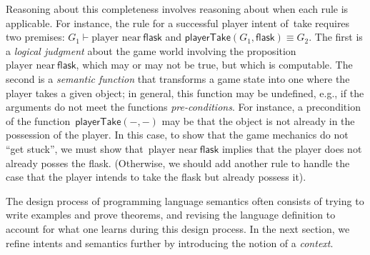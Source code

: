 Reasoning about this completeness involves reasoning about when each
rule is applicable.  
%
For instance, the rule for a successful player intent of~\textsf{take}
requires two premises:
$G_1 \vdash \textrm{player near}~\textsf{flask}$
and
$\textsf{playerTake}(G_1,\textsf{flask}) \equiv G_2$.
%
The first is a \emph{logical judgment} about the game world involving
the proposition~$\textrm{player near}~\textsf{flask}$, which may or
may not be true, but which is computable.
%
The second is a \emph{semantic function} that transforms a game state
into one where the player takes a given object; in general, this
function may be undefined, e.g., if the arguments do not meet the
functions \emph{pre-conditions}.
%
For instance, a precondition of the
function~$\textsf{playerTake}(-,-)$ may be that the object is not
already in the possession of the player.
%
In this case, to show that the game mechanics do not ``get stuck'', we
must show that~$\textrm{player near}~\textsf{flask}$ implies that the
player does not already posses the flask.
%
(Otherwise, we should add another rule to handle the case that the
player intends to take the flask but already possess it).
%

The design process of programming language semantics often consists of
trying to write examples and prove theorems, and revising the language
definition to account for what one learns during this design process.
%
In the next section, we refine intents and semantics further by
introducing the notion of a \emph{context}.


